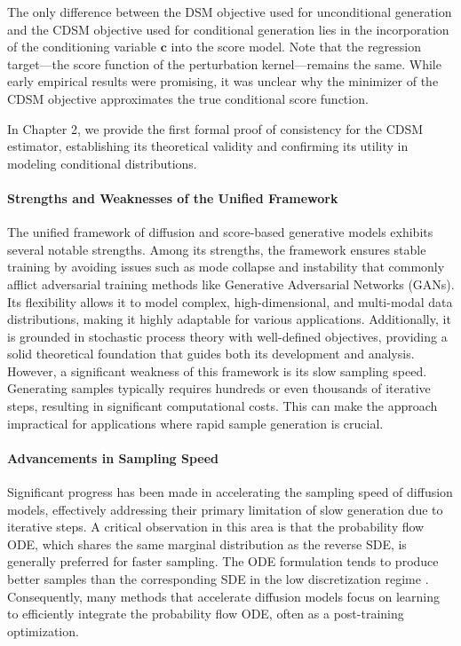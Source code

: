 The only difference between the DSM objective used for unconditional generation and the CDSM objective used for conditional generation lies in the incorporation of the conditioning variable \( \mathbf{c} \) into the score model. Note that the regression target—the score function of the perturbation kernel—remains the same. While early empirical results were promising, it was unclear why the minimizer of the CDSM objective approximates the true conditional score function. 

In Chapter 2, we provide the first formal proof of consistency for the CDSM estimator, establishing its theoretical validity and confirming its utility in modeling conditional distributions. 


\paragraph{Strengths and Weaknesses of the Unified Framework}
The unified framework of diffusion and score-based generative models exhibits several notable strengths. Among its strengths, the framework ensures stable training by avoiding issues such as mode collapse and instability that commonly afflict adversarial training methods like Generative Adversarial Networks (GANs). Its flexibility allows it to model complex, high-dimensional, and multi-modal data distributions, making it highly adaptable for various applications. Additionally, it is grounded in stochastic process theory with well-defined objectives, providing a solid theoretical foundation that guides both its development and analysis. However, a significant weakness of this framework is its slow sampling speed. Generating samples typically requires hundreds or even thousands of iterative steps, resulting in significant computational costs. This can make the approach impractical for applications where rapid sample generation is crucial.

\paragraph{Advancements in Sampling Speed}
Significant progress has been made in accelerating the sampling speed of diffusion models, effectively addressing their primary limitation of slow generation due to iterative steps. A critical observation in this area is that the probability flow ODE, which shares the same marginal distribution as the reverse SDE, is generally preferred for faster sampling. The ODE formulation tends to produce better samples than the corresponding SDE in the low discretization regime \cite{song2020score}. Consequently, many methods that accelerate diffusion models focus on learning to efficiently integrate the probability flow ODE, often as a post-training optimization.

